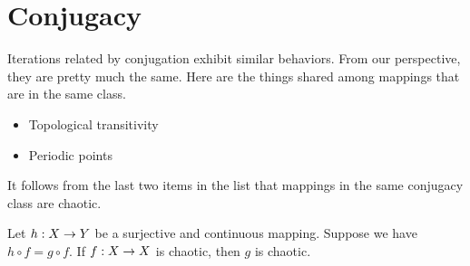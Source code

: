 \documentclass[11pt]{book}
\begin{document}
\section{Conjugacy}
Iterations related by conjugation exhibit similar behaviors. From our perspective, they are pretty much the same.
Here are the things shared among mappings that are in the same class.
\begin{itemize}
  \item Topological transitivity
  \item Periodic points
\end{itemize}
It follows from the last two items in the list that mappings in the same conjugacy class are chaotic.
\begin{proposition}
  Let $h: X\rightarrow Y$ be a surjective and continuous mapping. Suppose we have $h\circ f = g\circ f$. If $f: X\rightarrow X$ is chaotic,
  then $g$ is chaotic.
\end{proposition}
\end{document}
